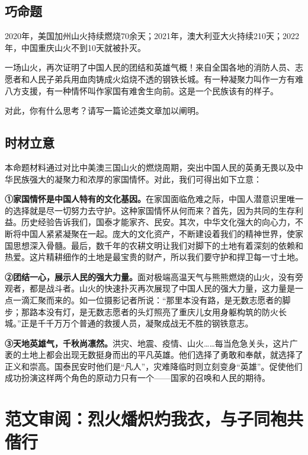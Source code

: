 \subsection*{巧命题}

2020年，美国加州山火持续燃烧70余天；2021年，澳大利亚大火持续210天；2022年，中国重庆山火不到10天就被扑灭。

一场山火，再次证明了中国人民的团结和英雄气概！来自全国各地的消防人员、志愿者和人民子弟兵用血肉铸成火焰烧不透的钢铁长城。有一种凝聚力叫作一方有难八方支援，有一种情怀叫作家国有难舍生向前。这是一个民族该有的样子。

对此，你有什么思考？请写一篇论述类文章加以阐明。

\subsection*{时材立意}

本命题材料通过对比中美澳三国山火的燃烧周期，突出中国人民的英勇无畏以及中华民族强大的凝聚力和浓厚的家国情怀。对此，我们可得出如下立意：

\textbf{①家国情怀是中国人特有的文化基因。}在家国面临危难之际，中国人潜意识里唯一的选择就是尽一切努力去守护。这种家国情怀从何而来？首先，因为共同的生存利益。历史经验告诉我们，国泰才能家齐、民安。其次，中华文化强大的向心力，不断将中国人紧紧凝聚在一起。庞大的文化资产，不断建设着我们的精神世界，使家国思想深入骨髓。最后，数千年的农耕文明让我们对脚下的土地有着深刻的依赖和热爱。这片精耕细作的土地是最宝贵的财产，所以我们要守护和捍卫每一寸土地。

\textbf{②团结一心，展示人民的强大力量。}面对极端高温天气与熊熊燃烧的山火，没有旁观者，都是战斗者。山火的快速扑灭再次展现了中国人民的强大力量，这力量是一点一滴汇聚而来的。如一位摄影记者所说：“那里本没有路，是无数志愿者的脚步；那路本没有灯，是无数志愿者的头灯照亮了重庆儿女用身躯构筑的防火长城。”正是千千万万个普通的救援人员，凝聚成战无不胜的钢铁意志。

\textbf{③天地英雄气，千秋尚凛然。}洪灾、地震、疫情、山火……每当危急关头，这片广袤的土地上都会出现无数挺身而出的平凡英雄。他们选择了勇敢和奉献，就选择了正义和崇高。国泰民安时他们是“凡人”，灾难降临时则立刻变身“英雄”。促使他们成功扮演这样两个角色的原动力只有一个——国家的召唤和人民的期待。

\clearpage
\section*{范文审阅：烈火燔炽灼我衣，与子同袍共偕行}

